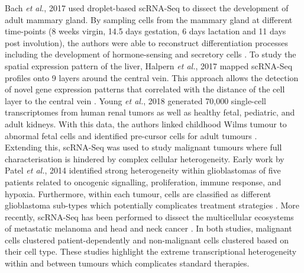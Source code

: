 Bach \emph{et al.}, 2017 used droplet-based scRNA-Seq to dissect the development of adult mammary gland. By sampling cells from the mammary gland at different time-points (8 weeks virgin, 14.5 days gestation, 6 days lactation and 11 days post involution), the authors were able to reconstruct differentiation processes including the development of hormone-sensing and secretory cells \citep{Bach2017}. To study the spatial expression pattern of the liver, Halpern \emph{et al.}, 2017 mapped scRNA-Seq profiles onto 9 layers around the central vein. This approach allows the detection of novel gene expression patterns that correlated with the distance of the cell layer to the central vein \citep{Halpern2017}. Young \emph{et al.}, 2018 generated 70,000 single-cell transcriptomes from human renal tumors as well as healthy fetal, pediatric, and adult kidneys. With this data, the authors linked childhood Wilms tumour to abnormal fetal cells and identified pre-cursor cells for adult tumours \citep{Young2018}. \\

Extending this, scRNA-Seq was used to study malignant tumours where full characterisation is hindered by complex cellular heterogeneity. Early work by Patel \emph{et al.}, 2014 identified strong heterogeneity within glioblastomas of five patients related to oncogenic signalling, proliferation, immune response, and hypoxia. Furthermore, within each tumour, cells are classified as different glioblastoma sub-types which potentially complicates treatment strategies \citep{Patel2014}. More recently, scRNA-Seq has been performed to dissect the multicellular ecosystems of metastatic melanoma \citep{Tirosh2016} and head and neck cancer \citep{Puram2017}. In both studies, malignant cells clustered patient-dependently and non-malignant cells clustered based on their cell type. These studies highlight the extreme transcriptional heterogeneity within and between tumours which complicates standard therapies. \\

